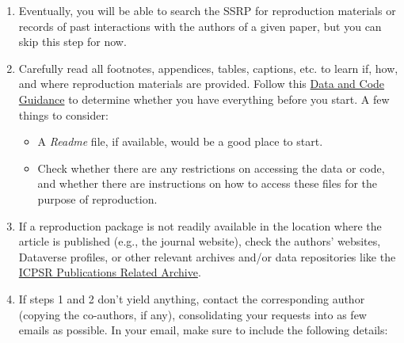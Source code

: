 \documentclass[
]{book}
\providecommand{\tightlist}{%
  \setlength{\itemsep}{0pt}\setlength{\parskip}{0pt}}
\begin{document}
\begin{enumerate}
\def\labelenumi{\arabic{enumi}.}
\item
  Eventually, you will be able to search the SSRP for reproduction materials or records of past interactions with the authors of a given paper, but you can skip this step for now.
\item
  Carefully read all footnotes, appendices, tables, captions, etc. to learn if, how, and where reproduction materials are provided. Follow this \href{https://social-science-data-editors.github.io/guidance/Verification_guidance.html}{Data and Code Guidance} to determine whether you have everything before you start. A few things to consider:

  \begin{itemize}
  \tightlist
  \item
    A \emph{Readme} file, if available, would be a good place to start.\\
  \item
    Check whether there are any restrictions on accessing the data or code, and whether there are instructions on how to access these files for the purpose of reproduction.
  \end{itemize}
\item
  If a reproduction package is not readily available in the location where the article is published (e.g., the journal website), check the authors' websites, Dataverse profiles, or other relevant archives and/or data repositories like the \href{https://www.icpsr.umich.edu/icpsrweb/}{ICPSR Publications Related Archive}.
\item
  If steps 1 and 2 don't yield anything, contact the corresponding author (copying the co-authors, if any), consolidating your requests into as few emails as possible. In your email, make sure to include the following details:


\end{enumerate}
\end{document}
